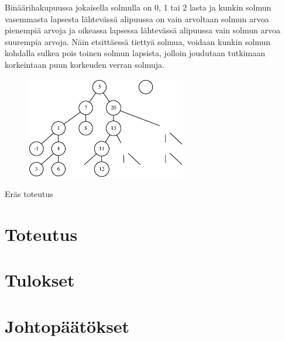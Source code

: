 \documentclass[12pt,a4paper,titlepage]{article}
\begin{document}
Binäärihakupuussa jokaisella solmulla on 0, 1 tai 2 lasta ja kunkin solmun vasemmasta lapsesta lähtevässä alipuussa on vain arvoltaan solmun arvoa pienempiä arvoja ja oikeassa lapsessa lähtevässä alipuussa vain solmun arvoa suurempia arvoja. Näin etsittäessä tiettyä solmua, voidaan kunkin solmun kohdalla sulkea pois toinen solmun lapsista, jolloin joudutaan tutkimaan korkeintaan puun korkeuden verran solmuja.

\begin{figure}
\centering
\includegraphics[width=7cm]{graphs/binaaripuu.eps}
\caption{}
\label{binaaripuu}
\end{figure}

Eräs toteutus 



\section{Toteutus}


\section{Tulokset}

\section{Johtopäätökset}




\newpage

 
%
\end{document}
